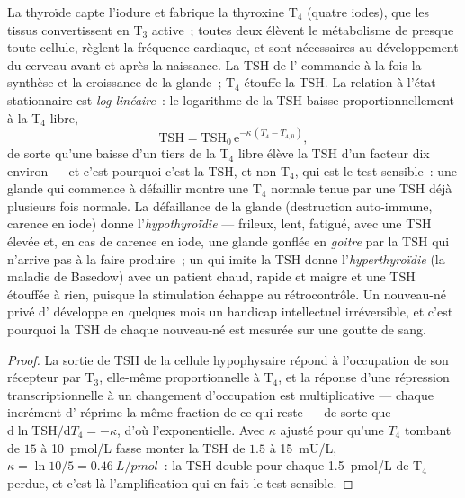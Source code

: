 \begin{proposition}\label{prop:b3:endocrinology:thyroid}
La thyroïde capte l'iodure et fabrique la thyroxine T$_{4}$ (quatre
iodes), que les tissus convertissent en T$_{3}$ active~; toutes deux
élèvent le métabolisme de presque toute cellule, règlent la fréquence
cardiaque, et sont nécessaires au développement du cerveau avant et
après la naissance. La TSH de l' commande à la fois la synthèse
et la croissance de la glande~; T$_{4}$ étouffe la TSH. La relation à
l'état stationnaire est \emph{log-linéaire}~: le logarithme de la TSH
baisse proportionnellement à la T$_{4}$ libre,
\[
\text{TSH} = \text{TSH}_{0}\,\mathrm{e}^{-\kappa\,(T_{4} - T_{4,0})},
\]
de sorte qu'une baisse d'un tiers de la T$_{4}$ libre élève la TSH d'un
facteur dix environ --- et c'est pourquoi c'est la TSH, et non T$_{4}$,
qui est le test sensible~: une glande qui commence à défaillir montre
une T$_{4}$ normale tenue par une TSH déjà plusieurs fois normale. La
défaillance de la glande (destruction auto-immune, carence en iode)
donne l'\emph{hypothyroïdie} --- frileux, lent, fatigué, avec une TSH
élevée et, en cas de carence en iode, une glande gonflée en
\emph{goitre} par la TSH qui n'arrive pas à la faire produire~; un
 qui imite la TSH donne l'\emph{hyperthyroïdie} (la maladie de
Basedow) avec un patient chaud, rapide et maigre et une TSH étouffée à
rien, puisque la stimulation échappe au rétrocontrôle. Un nouveau-né
privé d' développe en quelques mois un handicap
intellectuel irréversible, et c'est pourquoi la TSH de chaque nouveau-né
est mesurée sur une goutte de sang.
\end{proposition}
\begin{proof}
La sortie de TSH de la cellule hypophysaire répond à l'occupation de son
récepteur par T$_{3}$, elle-même proportionnelle à T$_{4}$, et la
réponse d'une répression transcriptionnelle à un changement d'occupation
est multiplicative --- chaque incrément d' réprime la même
fraction de ce qui reste --- de sorte que
$\mathrm{d}\ln\text{TSH}/\mathrm{d}T_{4} = -\kappa$, d'où
l'exponentielle. Avec $\kappa$ ajusté pour qu'une $T_{4}$ tombant de
$15$ à \qty{10}{pmol/L} fasse monter la TSH de $1.5$ à \qty{15}{mU/L},
$\kappa = \ln 10/5 = \qty{0.46}{L/pmol}$~: la TSH double pour chaque
\qty{1.5}{pmol/L} de T$_{4}$ perdue, et c'est là l'amplification qui en
fait le test sensible.
\end{proof}

